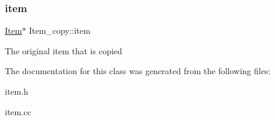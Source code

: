 \subsubsection{\texorpdfstring{item}{item}}
{\footnotesize\ttfamily \mbox{\hyperlink{classItem}{Item}}$\ast$ Item\+\_\+copy\+::item\hspace{0.3cm}{\ttfamily [protected]}}

The original item that is copied 

The documentation for this class was generated from the following files\+:\begin{DoxyCompactItemize}
\item 
item.\+h\item 
item.\+cc\end{DoxyCompactItemize}
